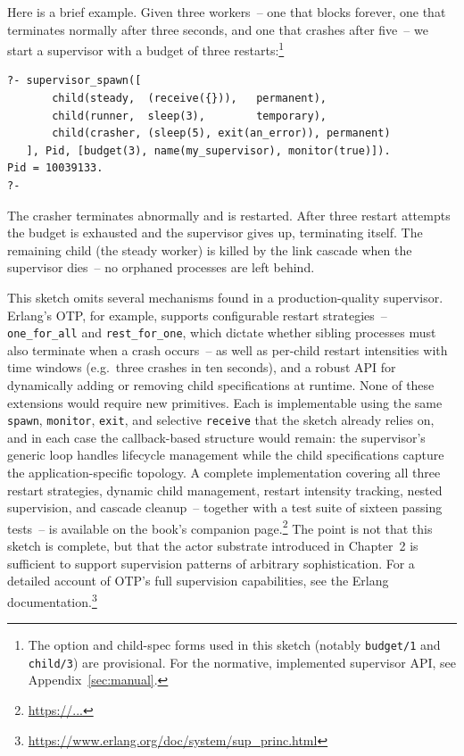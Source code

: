 Here is a brief example. Given three workers~-- one that blocks forever,
one that terminates normally after three seconds, and one that crashes
after five~-- we start a supervisor with a budget of three restarts:\footnote{The option and child-spec forms used in this sketch (notably \texttt{budget/1} and \texttt{child/3}) are provisional. For the normative, implemented supervisor API, see Appendix~\ref{sec:manual}.}
%
\begin{verbatim}
?- supervisor_spawn([
       child(steady,  (receive({})),   permanent),
       child(runner,  sleep(3),        temporary),
       child(crasher, (sleep(5), exit(an_error)), permanent)
   ], Pid, [budget(3), name(my_supervisor), monitor(true)]).
Pid = 10039133.   
?-
\end{verbatim}
%
The crasher terminates abnormally and is restarted. After three restart
attempts the budget is exhausted and the supervisor gives up, terminating
itself. The remaining child (the steady worker) is killed by the link
cascade when the supervisor dies~-- no orphaned processes are left behind.

This sketch omits several mechanisms found in a production-quality
supervisor. Erlang's OTP, for example, supports configurable restart
strategies~-- \texttt{one\_for\_all} and \texttt{rest\_for\_one}, which
dictate whether sibling processes must also terminate when a crash
occurs~-- as well as per-child restart intensities with time windows (e.g.\
three crashes in ten seconds), and a robust API for dynamically adding or
removing child specifications at runtime. None of these extensions would
require new primitives. Each is implementable using the same
\texttt{spawn}, \texttt{monitor}, \texttt{exit}, and selective
\texttt{receive} that the sketch already relies on, and in each case the
callback-based structure would remain: the supervisor's generic loop
handles lifecycle management while the child specifications capture the
application-specific topology. A complete implementation covering all three
restart strategies, dynamic child management, restart intensity tracking,
nested supervision, and cascade cleanup~-- together with a test suite of
sixteen passing tests~-- is available on the book's companion
page.\footnote{\url{https://...}} %
The point is not that this sketch is complete, but that the actor substrate
introduced in Chapter~2 is sufficient to support supervision patterns of
arbitrary sophistication. For a detailed account of OTP's full supervision
capabilities, see the Erlang
documentation.\footnote{\url{https://www.erlang.org/doc/system/sup\_princ.html}}


